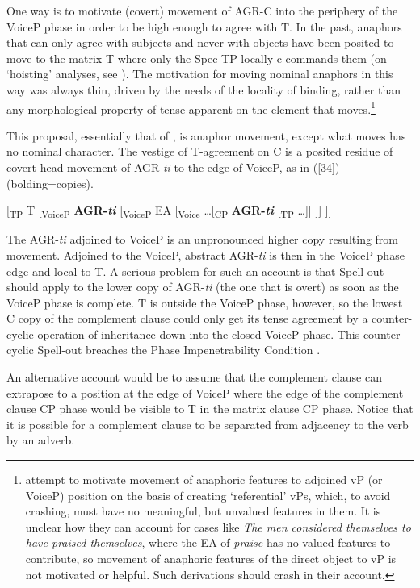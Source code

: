 \documentclass[output=paper,
modfonts
]{langscibook}
\begin{document}
One way is to motivate (covert) movement of AGR-C into the periphery of the VoiceP phase in order to be high enough to agree with T. In the past, anaphors that can only agree with subjects and never with objects have been posited to move to the matrix T where only the Spec-TP locally c-commands them (on ‘hoisting’ analyses, see \citealt{Safir2013}). The motivation for moving nominal anaphors in this way was always thin, driven by the needs of the locality of binding, rather than any morphological property of tense apparent on the element that moves.\footnote{\citeauthor{Diercks2017a} attempt to motivate movement of anaphoric features to adjoined vP (or VoiceP) position on the basis of creating `referential' vPs, which, to avoid crashing, must have no meaningful, but unvalued features in them. It is unclear how they can account for cases like \textit{The men considered themselves to have praised themselves}, where the EA of \textit{praise} has no valued features to contribute, so movement of anaphoric features of the direct object to vP is not motivated or helpful. Such derivations should crash in their account.}

This proposal, essentially that of \cite{Diercks2017a}, is anaphor movement, except what moves has no nominal character. The vestige of T-agreement on C is a posited residue of covert head-movement of AGR-\textit{ti} to the edge of VoiceP, as in (\ref{34}) (bolding=copies).

\ea \label{34}
\textup{[\textsubscript{TP} T  [\textsubscript{VoiceP}} \textbf{AGR-\textit{ti}} \textup{[\textsubscript{VoiceP} EA [\textsubscript{Voice} …[\textsubscript{CP}} \textbf{AGR-\textit{ti}} \textup{[\textsubscript{TP} …]] ]] ]]}
 \z

The AGR-\textit{ti} adjoined to VoiceP is an unpronounced higher copy resulting from movement. Adjoined to the VoiceP, abstract AGR-\textit{ti} is then in the VoiceP phase edge and local to T. A serious problem for such an account is that Spell-out should apply to the lower copy of AGR-\textit{ti} (the one that is overt) as soon as the VoiceP phase is complete. T is outside the VoiceP phase, however, so the lowest C copy of the complement clause could only get its tense agreement by a counter-cyclic operation of inheritance down into the closed VoiceP phase. This counter-cyclic Spell-out breaches the Phase Impenetrability Condition \citep{Chomsky2001}.


An alternative account would be to assume that the complement clause can extrapose to a position at the edge of VoiceP where the edge of the complement clause CP phase would be visible to T in the matrix clause CP phase. Notice that it is possible for a complement clause to be separated from adjacency to the verb by an adverb.
\end{document}
